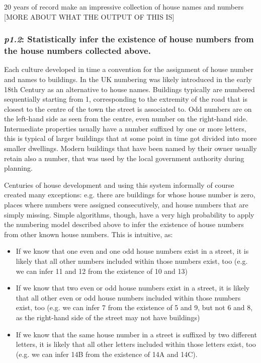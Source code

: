         20 years of record make an impressive collection of house names and numbers [MORE ABOUT WHAT THE OUTPUT OF THIS IS]

    \subsubsection{{\it p1.2}: Statistically infer the existence of house numbers from the house numbers collected above.} 

        Each culture developed in time a convention for the assignment of house number and names to buildings. In the UK numbering was likely introduced in the early 18th Century as an alternative to house names. Buildings typically are numbered sequentially starting from 1, corresponding to the extremity of the road that is closest to the centre of the town the street is associated to. Odd numbers are on the left-hand side as seen from the centre, even number on the right-hand side. Intermediate properties usually have a number suffixed by one or more letters, this is typical of larger buildings that at some point in time got divided into more smaller dwellings. Modern buildings that have been named by their owner usually retain also a number, that was used by the local government authority during planning.
        
        Centuries of house development and using this system informally of course created many exceptions: e.g. there are buildings for whose house number is zero, places where numbers were assigned consecutively, and house numbers that are simply missing. Simple algorithms, though, have a very high probability to apply the numbering model described above to infer the existence of house numbers from other known house numbers. This is intuitive, as: 
        \begin{itemize}
            \item If we know that one even and one odd house numbers exist in a street, it is likely that all other numbers included within those numbers exist, too (e.g. we can infer 11 and 12 from the existence of 10 and 13)
            \item If we know that two even or odd house numbers exist in a street, it is likely that all other even or odd house numbers included within those numbers exist, too (e.g. we can infer 7 from the existence of 5 and 9, but not 6 and 8, as the right-hand side of the street may not have buildings)
            \item If we know that the same house number in a street is suffixed by two different letters, it is likely that all other letters included within those letters exist, too (e.g. we can infer 14B from the existence of 14A and 14C).
        \end{itemize}
        
